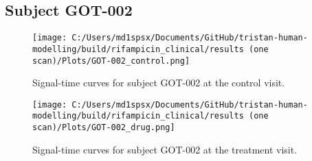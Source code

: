\documentclass{epflreport}%
\begin{document}
\subsection{Subject GOT{-}002}%
\label{subsec:SubjectGOT{-}002}%

%


\begin{figure}[h!]%
\centering%
\texttt{[image: C:/Users/md1spsx/Documents/GitHub/tristan-human-modelling/build/rifampicin\_clinical/results (one scan)/Plots/GOT-002\_control.png]}%
\caption{Signal{-}time curves for subject GOT{-}002 at the control visit.}%
\end{figure}

%


\begin{figure}[h!]%
\centering%
\texttt{[image: C:/Users/md1spsx/Documents/GitHub/tristan-human-modelling/build/rifampicin\_clinical/results (one scan)/Plots/GOT-002\_drug.png]}%
\caption{Signal{-}time curves for subject GOT{-}002 at the treatment visit.}%
\end{figure}
\end{document}
